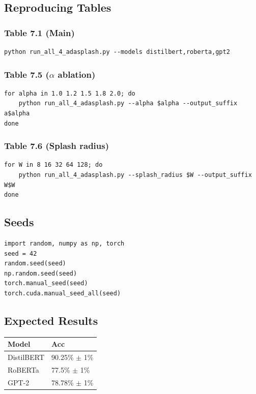 \subsection{Reproducing Tables}

\subsubsection{Table 7.1 (Main)}
\begin{lstlisting}
python run_all_4_adasplash.py --models distilbert,roberta,gpt2
\end{lstlisting}

\subsubsection{Table 7.5 ($\alpha$ ablation)}
\begin{lstlisting}
for alpha in 1.0 1.2 1.5 1.8 2.0; do
    python run_all_4_adasplash.py --alpha $alpha --output_suffix a$alpha
done
\end{lstlisting}

\subsubsection{Table 7.6 (Splash radius)}
\begin{lstlisting}
for W in 8 16 32 64 128; do
    python run_all_4_adasplash.py --splash_radius $W --output_suffix W$W
done
\end{lstlisting}

\subsection{Seeds}

\begin{lstlisting}
import random, numpy as np, torch
seed = 42
random.seed(seed)
np.random.seed(seed)
torch.manual_seed(seed)
torch.cuda.manual_seed_all(seed)
\end{lstlisting}

\subsection{Expected Results}

\begin{table}[H]
\centering
\small
\begin{tabular}{ll}
\toprule
\textbf{Model} & \textbf{Acc} \\
\midrule
DistilBERT & 90.25\% $\pm$ 1\% \\
RoBERTa & 77.5\% $\pm$ 1\% \\
GPT-2 & 78.78\% $\pm$ 1\% \\
\bottomrule
\end{tabular}
\end{table}

